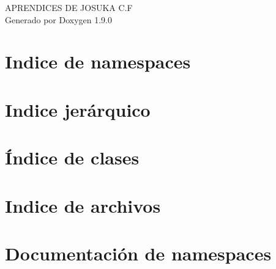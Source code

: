 \let\mypdfximage\pdfximage\def\pdfximage{\immediate\mypdfximage}\documentclass[twoside]{book}
\newcommand{\+}{\discretionary{\mbox{\scriptsize$\hookleftarrow$}}{}{}}
\newcommand{\clearemptydoublepage}{%
  \newpage{\pagestyle{empty}\cleardoublepage}%
}
\begin{document}
\raggedbottom

\hypersetup{pageanchor=false,
             bookmarksnumbered=true,
             pdfencoding=unicode
            }
\begin{titlepage}
\vspace*{7cm}
\begin{center}%
{\Large APRENDICES DE JOSUKA C.\+F }\\
\vspace*{1cm}
{\large Generado por Doxygen 1.9.0}\\
\end{center}
\end{titlepage}
\clearemptydoublepage
{}
\tableofcontents
\clearemptydoublepage
{}
\hypersetup{pageanchor=true}

\chapter{Indice de namespaces}

\chapter{Indice jerárquico}

\chapter{Índice de clases}

\chapter{Indice de archivos}

\chapter{Documentación de namespaces}



















\end{document}
